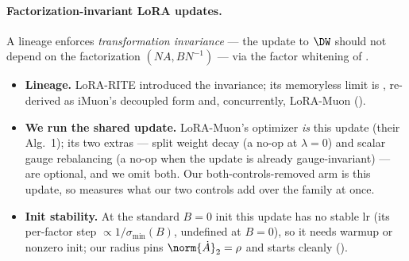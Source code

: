 \paragraph{Factorization-invariant LoRA updates.} A lineage enforces \emph{transformation invariance} --- the update to $\DW$ should not depend on the factorization $(NA,BN^{-1})$ --- via the factor whitening of .
\begin{itemize}[leftmargin=1.5em,itemsep=1pt,topsep=2pt]
  \item \textbf{Lineage.} LoRA-RITE \cite{lorarite} introduced the invariance; its memoryless limit is , re-derived as iMuon's decoupled form \cite{imuon} and, concurrently, LoRA-Muon \cite{loramuon} ().
  \item \textbf{We run the shared update.} LoRA-Muon's optimizer \emph{is} this update (their Alg.~1); its two extras --- split weight decay (a no-op at $\lambda{=}0$) and scalar gauge rebalancing (a no-op when the update is already gauge-invariant) --- are optional, and we omit both. Our both-controls-removed arm is this update, so  measures what our two controls add over the family at once.
  \item \textbf{Init stability.} At the standard $B{=}0$ init this update has no stable lr (its per-factor step $\propto 1/\sigma_{\min}(B)$, undefined at $B{=}0$), so it needs warmup or nonzero init; our radius pins $\norm{\dot A}_2=\rho$ and starts cleanly ().
\end{itemize}


